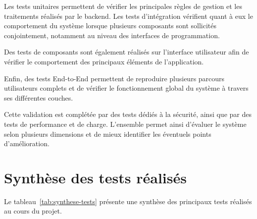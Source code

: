 Les tests unitaires permettent de vérifier les principales règles de gestion et les traitements réalisés par le backend. Les tests d'intégration vérifient quant à eux le comportement du système lorsque plusieurs composants sont sollicités conjointement, notamment au niveau des interfaces de programmation.

Des tests de composants sont également réalisés sur l'interface utilisateur afin de vérifier le comportement des principaux éléments de l'application.

Enfin, des tests End-to-End permettent de reproduire plusieurs parcours utilisateurs complets et de vérifier le fonctionnement global du système à travers ses différentes couches.

Cette validation est complétée par des tests dédiés à la sécurité, ainsi que par des tests de performance et de charge. L'ensemble permet ainsi d'évaluer le système selon plusieurs dimensions et de mieux identifier les éventuels points d'amélioration.


\section{Synthèse des tests réalisés}


Le tableau~\ref{tab:synthese-tests} présente une synthèse des principaux tests réalisés au cours du projet.

\renewcommand{\arraystretch}{1.3}

